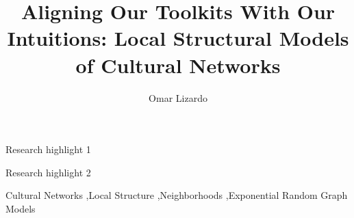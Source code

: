 \documentclass[preprint,12pt,authoryear]{elsarticle}
\begin{document}
\begin{frontmatter}



\title{Aligning Our Toolkits With Our Intuitions: Local Structural Models of Cultural Networks}


\author[inst1]{Omar Lizardo}



\begin{abstract}

\end{abstract}


\begin{highlights}
\item Research highlight 1
\item Research highlight 2
\end{highlights}

\begin{keyword}
Cultural Networks \sep Local Structure \sep Neighborhoods \sep Exponential Random Graph Models
\end{keyword}

\end{frontmatter}
\end{document}
